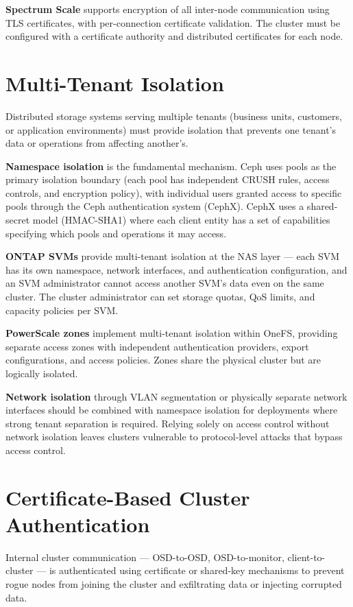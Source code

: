 \textbf{Spectrum Scale} supports encryption of all inter-node communication using TLS certificates, with per-connection certificate validation. The cluster must be configured with a certificate authority and distributed certificates for each node.

\section{Multi-Tenant Isolation}
Distributed storage systems serving multiple tenants (business units, customers, or application environments) must provide isolation that prevents one tenant's data or operations from affecting another's.

\textbf{Namespace isolation} is the fundamental mechanism. Ceph uses pools as the primary isolation boundary (each pool has independent CRUSH rules, access controls, and encryption policy), with individual users granted access to specific pools through the Ceph authentication system (CephX). CephX uses a shared-secret model (HMAC-SHA1) where each client entity has a set of capabilities specifying which pools and operations it may access.

\textbf{ONTAP SVMs} provide multi-tenant isolation at the NAS layer --- each SVM has its own namespace, network interfaces, and authentication configuration, and an SVM administrator cannot access another SVM's data even on the same cluster. The cluster administrator can set storage quotas, QoS limits, and capacity policies per SVM.

\textbf{PowerScale zones} implement multi-tenant isolation within OneFS, providing separate access zones with independent authentication providers, export configurations, and access policies. Zones share the physical cluster but are logically isolated.

\textbf{Network isolation} through VLAN segmentation or physically separate network interfaces should be combined with namespace isolation for deployments where strong tenant separation is required. Relying solely on access control without network isolation leaves clusters vulnerable to protocol-level attacks that bypass access control.

\section{Certificate-Based Cluster Authentication}
Internal cluster communication --- OSD-to-OSD, OSD-to-monitor, client-to-cluster --- is authenticated using certificate or shared-key mechanisms to prevent rogue nodes from joining the cluster and exfiltrating data or injecting corrupted data.

